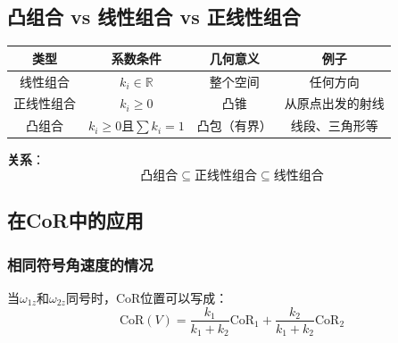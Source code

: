 \documentclass[12pt,a4paper]{article}
\begin{document}
\begin{center}
\end{center}

\subsection{凸组合 vs 线性组合 vs 正线性组合}

\begin{center}
\begin{tabular}{|c|c|c|c|}
\hline
\textbf{类型} & \textbf{系数条件} & \textbf{几何意义} & \textbf{例子} \\
\hline
线性组合 & $k_i \in \mathbb{R}$ & 整个空间 & 任何方向 \\
\hline
正线性组合 & $k_i \geq 0$ & 凸锥 & 从原点出发的射线 \\
\hline
凸组合 & $k_i \geq 0$且$\sum k_i = 1$ & 凸包（有界） & 线段、三角形等 \\
\hline
\end{tabular}
\end{center}

\textbf{关系}：
\begin{equation}
\text{凸组合} \subseteq \text{正线性组合} \subseteq \text{线性组合}
\end{equation}

\subsection{在CoR中的应用}

\subsubsection{相同符号角速度的情况}

当$\omega_{1z}$和$\omega_{2z}$同号时，CoR位置可以写成：
\begin{equation}
\text{CoR}(V) = \frac{k_1}{k_1 + k_2} \text{CoR}_1 + \frac{k_2}{k_1 + k_2} \text{CoR}_2
\end{equation}
\end{document}
